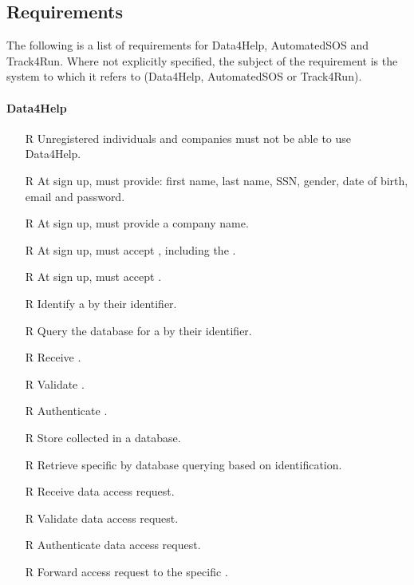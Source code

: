 \documentclass[../../../rasd.tex]{subfiles}
\begin{document}
\subsection{Requirements}
		The following is a list of requirements for Data4Help, AutomatedSOS and Track4Run. Where not explicitly specified, the subject of the requirement is the system to which it refers to (Data4Help, AutomatedSOS or Track4Run).
        \paragraph{Data4Help}
        \begin{itemize}
            \item[R\subs{1}]Unregistered individuals and companies must not be able to use Data4Help.
            \item[R\subs{2}]At sign up,  must provide: first name, last name, SSN, gender, date of birth, email and password.
            \item[R\subs{3}]At sign up,  must provide a company name.
            \item[R\subs{4}]At sign up,  must accept , including the .
            \item[R\subs{5}]At sign up,  must accept .
            \item[R\subs{6}]Identify a  by their identifier.
            \item[R\subs{7}]Query the database for a  by their identifier.
            \item[R\subs{8}]Receive .
            \item[R\subs{9}]Validate .
            \item[R\subs{10}]Authenticate .
            \item[R\subs{11}]Store collected  in a database.
            \item[R\subs{12}]Retrieve specific  by database querying based on  identification.
            \item[R\subs{13}]Receive  data access request.
            \item[R\subs{14}]Validate  data access request.
            \item[R\subs{15}]Authenticate  data access request.
            \item[R\subs{16}]Forward  access request to the specific .

\end{itemize}
\end{document}
